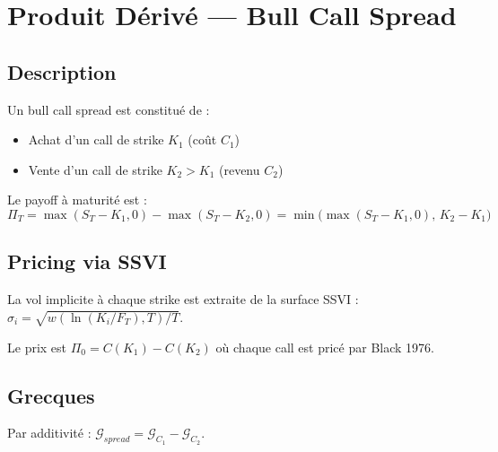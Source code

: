 \section{Produit Dérivé — Bull Call Spread}
\label{sec:produit}

\subsection{Description}

Un bull call spread est constitué de :
\begin{itemize}
  \item Achat d'un call de strike $K_1$ (coût $C_1$)
  \item Vente d'un call de strike $K_2 > K_1$ (revenu $C_2$)
\end{itemize}

Le payoff à maturité est :
\begin{equation}
  \Pi_T = \max(S_T - K_1, 0) - \max(S_T - K_2, 0) = \min\!\bigl(\max(S_T - K_1, 0),\, K_2 - K_1\bigr)
\end{equation}

\subsection{Pricing via SSVI}

La vol implicite à chaque strike est extraite de la surface SSVI :
$\sigma_i = \sqrt{w(\ln(K_i/F_T), T) / T}$.

Le prix est $\Pi_0 = C(K_1) - C(K_2)$ où chaque call est pricé par Black 1976.

\subsection{Grecques}

Par additivité : $\mathcal{G}_{spread} = \mathcal{G}_{C_1} - \mathcal{G}_{C_2}$.


